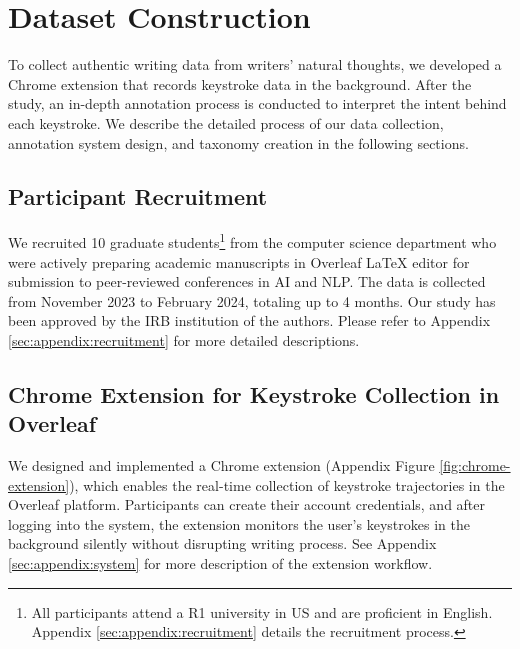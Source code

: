 
\section{Dataset Construction}
To collect authentic writing data from writers' natural thoughts, we developed a Chrome extension that records keystroke data in the background. After the study, an in-depth annotation process is conducted to interpret the intent behind each keystroke.
We describe the detailed process of our data collection, annotation system design, and taxonomy creation in the following sections.

\subsection{Participant Recruitment}\label{sec:recruitment}
We recruited 10 graduate students\footnote{All participants  attend a R1 university in US and are proficient in
English. Appendix \ref{sec:appendix:recruitment} details the recruitment process.} from the computer science department who were actively preparing academic manuscripts in Overleaf LaTeX  editor for submission to peer-reviewed conferences in AI and NLP. 
The data is collected from November 2023 to February 2024, totaling up to 4 months.
Our study has been approved by the IRB institution of the authors.
Please refer to Appendix \ref{sec:appendix:recruitment} for more detailed descriptions. 


\subsection{Chrome Extension for Keystroke Collection in Overleaf}
We designed and implemented a Chrome extension (Appendix Figure \ref{fig:chrome-extension}), which enables the real-time collection of keystroke trajectories in the Overleaf platform. Participants can create their account credentials, and after logging into the system, the extension monitors the user's keystrokes in the background silently without disrupting writing process. See Appendix \ref{sec:appendix:system} for more description of the extension workflow.





